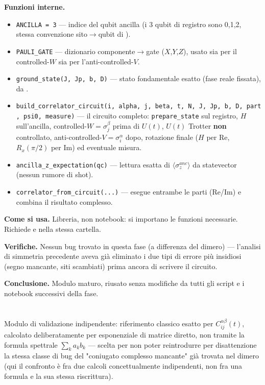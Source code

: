 \documentclass[11pt,a4paper]{article}
\begin{document}
\textbf{Funzioni interne.}
\begin{itemize}
\item \texttt{ANCILLA = 3} — indice del qubit ancilla (i 3 qubit di registro sono
0,1,2, stessa convenzione sito$\to$qubit di \texttt{}).
\item \texttt{PAULI\_GATE} — dizionario componente$\to$gate ($X$,$Y$,$Z$), usato sia
per il controlled-$W$ sia per l'anti-controlled-$V$.
\item \texttt{ground\_state(J,\ Jp,\ b,\ D)} — stato fondamentale esatto (fase reale
fissata), da \texttt{}.
\item \texttt{build\_correlator\_circuit(i,\ alpha,\ j,\ beta,\ t,\ N,\ J,\ Jp,\ b,\
D,\ part,\ psi0,\ measure)} — il circuito completo: \texttt{prepare\_state} sul
registro, $H$ sull'ancilla, controlled-$W=\sigma_j^\beta$ prima di $U(t)$, $U(t)$
Trotter \textbf{non} controllato, anti-controlled-$V=\sigma_i^\alpha$ dopo,
rotazione finale ($H$ per Re, $R_x(\pi/2)$ per Im) ed eventuale misura.
\item \texttt{ancilla\_z\_expectation(qc)} — lettura esatta di
$\langle\sigma_z^{anc}\rangle$ da statevector (nessun rumore di shot).
\item \texttt{correlator\_from\_circuit(...)} — esegue entrambe le parti (Re/Im) e
combina il risultato complesso.
\end{itemize}

\textbf{Come si usa.} Libreria, non notebook: si importano le funzioni necessarie.
Richiede \texttt{\seqsplit{trimer\_ring\_exact.py}} e
\texttt{} nella stessa cartella.

\textbf{Verifiche.} Nessun bug trovato in questa fase (a differenza del dimero) —
l'analisi di simmetria precedente aveva già eliminato i due tipi di errore più
insidiosi (segno mancante, siti scambiati) prima ancora di scrivere il circuito.

\textbf{Conclusione.} Modulo maturo, riusato senza modifiche da tutti gli script e
i notebook successivi della fase.

\section*{\texttt{}}

Modulo di validazione indipendente: riferimento classico esatto per
$C_{ij}^{\alpha\beta}(t)$, calcolato deliberatamente per esponenziale di matrice
diretto, non tramite la formula spettrale $\sum_k a_kb_k$ — scelta per non poter
reintrodurre per disattenzione la stessa classe di bug del "coniugato complesso
mancante" già trovata nel dimero (qui il confronto è fra due calcoli
concettualmente indipendenti, non fra una formula e la sua stessa riscrittura).
\end{document}
